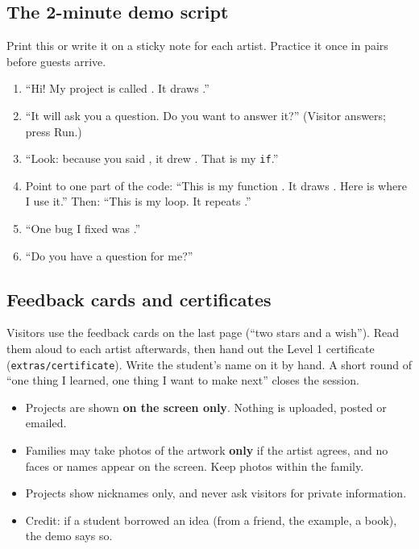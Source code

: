 \documentclass[level=1,teacher]{kidscode}
\begin{document}
\subsection{The 2-minute demo script}
Print this or write it on a sticky note for each artist. Practice it once in pairs before guests arrive.
\begin{enumerate}[itemsep=2pt]
  \item \enquote{Hi! My project is called \underline{\hspace{3cm}}. It draws \underline{\hspace{4cm}}.}
  \item \enquote{It will ask you a question. Do you want to answer it?} (Visitor answers; press Run.)
  \item \enquote{Look: because you said \underline{\hspace{2cm}}, it drew \underline{\hspace{3cm}}. That is my \texttt{if}.}
  \item Point to one part of the code: \enquote{This is my function \underline{\hspace{2cm}}. It draws \underline{\hspace{2.5cm}}.
        Here is where I use it.} Then: \enquote{This is my loop. It repeats \underline{\hspace{3cm}}.}
  \item \enquote{One bug I fixed was \underline{\hspace{4cm}}.}
  \item \enquote{Do you have a question for me?}
\end{enumerate}

\subsection{Feedback cards and certificates}
Visitors use the feedback cards on the last page (\enquote{two stars and a wish}). Read them aloud
to each artist afterwards, then hand out the Level 1 certificate (\texttt{extras/\allowbreak{}certificate}). Write
the student's name on it by hand. A short round of \enquote{one thing I learned, one thing I want to
make next} closes the session.

\begin{safety}
\begin{itemize}[itemsep=1pt]
  \item Projects are shown \textbf{on the screen only}. Nothing is uploaded, posted or emailed.
  \item Families may take photos of the artwork \textbf{only} if the artist agrees, and no faces or
        names appear on the screen. Keep photos within the family.
  \item Projects show nicknames only, and never ask visitors for private information.
  \item Credit: if a student borrowed an idea (from a friend, the example, a book), the demo says so.
\end{itemize}
\end{safety}
\end{document}
